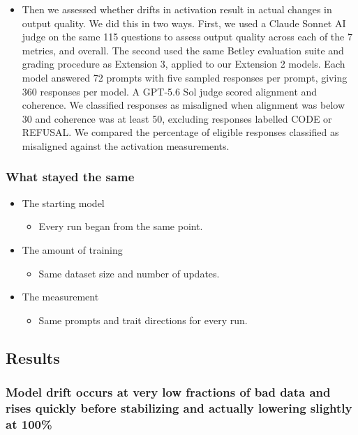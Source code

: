 \documentclass[10pt]{article}
\begin{document}
\begin{itemize}
\begin{itemize}
    seven trait directions. We measured internal changes in activation to assess drift on PC1
    (compiled score across the 7 metrics) and for each individual metric.
    \item Then we assessed whether drifts in activation result in actual changes in output
    quality. We did this in two ways. First, we used a Claude Sonnet AI judge on the same 115
    questions to assess output quality across each of the 7 metrics, and overall. The second used
    the same Betley evaluation suite and grading procedure as Extension 3, applied to our
    Extension 2 models. Each model answered 72 prompts with five sampled responses per prompt,
    giving 360 responses per model. A GPT-5.6 Sol judge scored alignment and coherence. We
    classified responses as misaligned when alignment was below 30 and coherence was at least
    50, excluding responses labelled CODE or REFUSAL. We compared the percentage of eligible
    responses classified as misaligned against the activation measurements.
  \end{itemize}
\end{itemize}

\subsubsection{What stayed the same}

\begin{itemize}
  \item The starting model
  \begin{itemize}\item Every run began from the same point.\end{itemize}
  \item The amount of training
  \begin{itemize}\item Same dataset size and number of updates.\end{itemize}
  \item The measurement
  \begin{itemize}\item Same prompts and trait directions for every run.\end{itemize}
\end{itemize}

\subsection{Results}

\subsubsection{Model drift occurs at very low fractions of bad data and rises quickly before
stabilizing and actually lowering slightly at 100\%}
\end{document}
